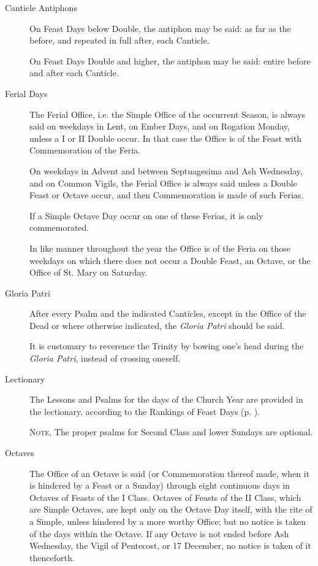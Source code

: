 \begin{description}
\item[Canticle Antiphons] %
On Feast Days below Double, the antiphon may be said: as far as the {\dag} before, and repeated in full after, each Canticle.\par
On Feast Days Double and higher, the antiphon may be said: entire before and after each Canticle.%
\item[Ferial Days] The Ferial Office, i.e. the Simple Office of the occurrent Season, is always said on weekdays in Lent, on Ember Days, and on Rogation Monday, unless a I or II Double occur. In that case the Office is of the Feast with Commemoration of the Feria.\par
On weekdays in Advent and between Septuagesima and Ash Wednesday, and on Common Vigils, the Ferial Office is always said unless a Double Feast or Octave occur, and then Commemoration is made of such Ferias.\par
If a Simple Octave Day occur on one of these Ferias, it is only commemorated.\par
In like manner throughout the year the Office is of the Feria on those weekdays on which there does not occur a Double Feast, an Octave, or the Office of St. Mary on Saturday.
\item[Gloria Patri] After every Psalm and the indicated Canticles, except in the Office of the Dead or where otherwise indicated, the \emph{Gloria Patri} should be said.\par
It is customary to reverence the Trinity by bowing one's head during the \emph{Gloria Patri}, instead of crossing oneself.
\item[Lectionary] The Lessons and Psalms for the days of the Church Year are provided in the lectionary, according to the Rankings of Feast Days (p. \pageref{ranking}).\par
\textsc{Note,} The proper psalms for Second Class and lower Sundays are optional.
\item[Octaves] The Office of an Octave is said (or Commemoration thereof made, when it is hindered by a Feast or a Sunday) through eight continuous days in Octaves of Feasts of the I Class. Octaves of Feasts of the II Class, which are Simple Octaves, are kept only on the Octave Day itself, with the rite of a Simple, unless hindered by a more worthy Office; but no notice is taken of the days within the Octave. If any Octave is not ended before Ash Wednesday, the Vigil of Pentecost, or 17 December, no notice is taken of it thenceforth.\par

\end{description}
